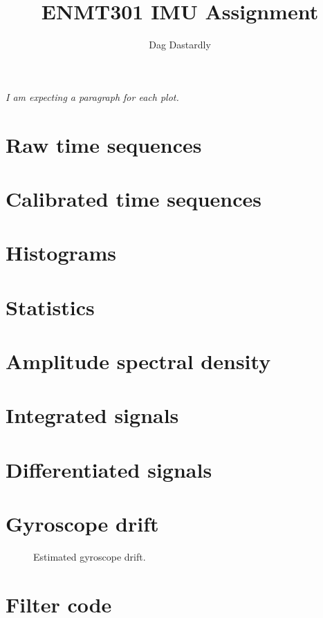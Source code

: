 \documentclass[a4paper,12pt]{article}
\title{ENMT301 IMU Assignment}
\author{Dag Dastardly}
\date{}
\newcommand{\comment}[1]{\emph{\color{blue}#1}}
\begin{document}
\maketitle

\comment{I am expecting a paragraph for each plot.}



\section{Raw time sequences}


\section{Calibrated time sequences}


\section{Histograms}


\section{Statistics}


\section{Amplitude spectral density}


\section{Integrated signals}


\section{Differentiated signals}


\section{Gyroscope drift}


\begin{figure}
    
  \caption{Estimated gyroscope drift.}
\end{figure}



\appendix
\pagebreak
\section{Filter code}


\lstset{language=python}
\lstset{basicstyle=\ttfamily\small}

\end{document}
